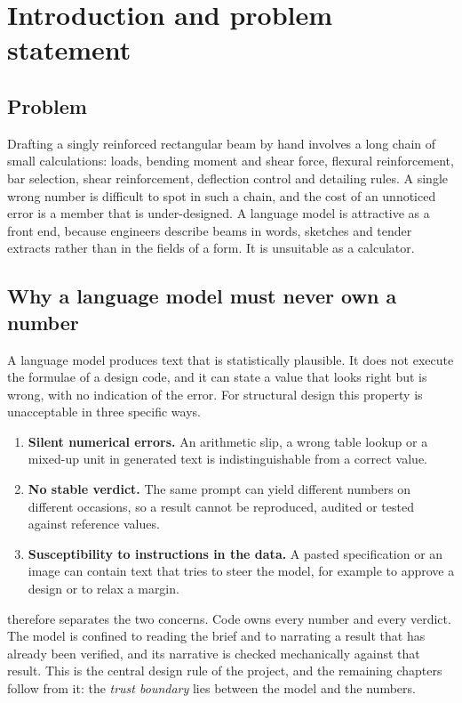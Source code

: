 \chapter{Introduction and problem statement}\label{ch:intro}

\section{Problem}
Drafting a singly reinforced rectangular beam by hand involves a long chain of small calculations: loads, bending moment and shear force, flexural reinforcement, bar selection, shear reinforcement, deflection control and detailing rules. A single wrong number is difficult to spot in such a chain, and the cost of an unnoticed error is a member that is under-designed. A language model is attractive as a front end, because engineers describe beams in words, sketches and tender extracts rather than in the fields of a form. It is unsuitable as a calculator.

\section{Why a language model must never own a number}
A language model produces text that is statistically plausible. It does not execute the formulae of a design code, and it can state a value that looks right but is wrong, with no indication of the error. For structural design this property is unacceptable in three specific ways.
\begin{enumerate}
  \item \textbf{Silent numerical errors.} An arithmetic slip, a wrong table lookup or a mixed-up unit in generated text is indistinguishable from a correct value.
  \item \textbf{No stable verdict.} The same prompt can yield different numbers on different occasions, so a result cannot be reproduced, audited or tested against reference values.
  \item \textbf{Susceptibility to instructions in the data.} A pasted specification or an image can contain text that tries to steer the model, for example to approve a design or to relax a margin.
\end{enumerate}
\sdcv{} therefore separates the two concerns. Code owns every number and every verdict. The model is confined to reading the brief and to narrating a result that has already been verified, and its narrative is checked mechanically against that result. This is the central design rule of the project, and the remaining chapters follow from it: the \emph{trust boundary} lies between the model and the numbers.

